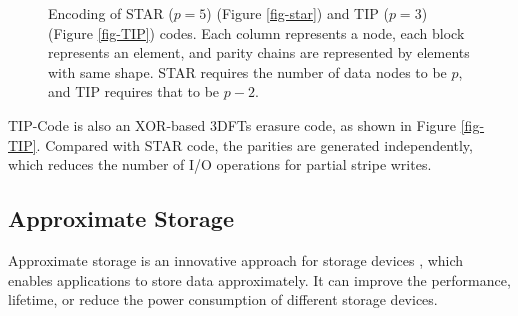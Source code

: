 \documentclass[sigconf]{acmart}
\begin{document}
\begin{figure}[ht]
\centering
{}
\hspace{6pt}
\caption{\small{Encoding of STAR ($p = 5$) (Figure \ref{fig-star}) and TIP ($p = 3$) (Figure \ref{fig-TIP}) codes. Each column represents a node, each block represents an element, and parity chains are represented by elements with same shape. STAR requires the number of data nodes to be $p$, and TIP requires that to be $p-2$.}}

\label{fig-star-TIP}
\end{figure}

TIP-Code\cite{TIP} is also an XOR-based 3DFTs erasure code, as shown in Figure \ref{fig-TIP}.
Compared with STAR code, the parities are generated independently, which reduces the number of I/O operations for partial stripe writes.

\subsection{Approximate Storage}
Approximate storage is an innovative approach for storage devices \cite{zhao2017approximate, sampson2014approximate, guo2016high, jevdjic2017approximate}, which enables applications to store data approximately. It can improve the performance, lifetime, or reduce the power consumption of different storage devices.
\end{document}
